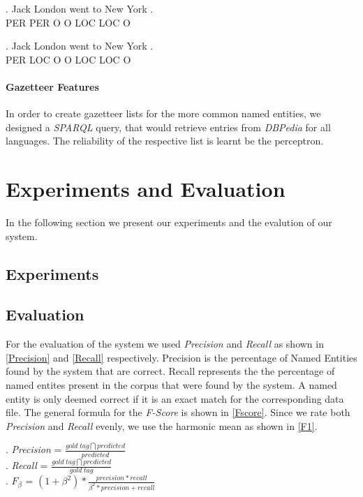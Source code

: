 \documentclass[11pt]{article}
\begin{document}
\exg. Jack London went to New York .\\
      PER   PER   O    O  LOC LOC  O \\\label{seq1}

\exg. Jack London went to New York . \\ 
      PER  LOC    O    O  LOC LOC O \\\label{seq2}
    

\paragraph*{Gazetteer Features}
In order to create gazetteer lists for the more common named entities, we designed a \emph{SPARQL} query, that would retrieve entries from \emph{DBPedia} for all
languages. The reliability of the respective list is learnt be the perceptron. 


\section{Experiments and Evaluation}
In the following section we present our experiments and the evalution of our system.
\subsection*{Experiments}


\subsection*{Evaluation}
For the evaluation of the system we used \emph{Precision} and \emph{Recall} as shown in \ref{Precision} and \ref{Recall} respectively.
Precision is the percentage of Named Entities found by the system that are correct. Recall represents the the percentage of 
named entites present in the corpus that were found by the system. 
A named entity is only deemed correct if it is an exact match for the corresponding data file.
The general formula for the \emph{F-Score} is shown in \ref{Fscore}. Since we rate both \emph{Precision} and \emph{Recall} evenly, we 
use the harmonic mean as shown in \ref{F1}.


\ex. \emph{Precision} = $ \frac{gold\; tag \bigcap predicted}{predicted}$ \label{Precision}\\


\ex. \emph{Recall} = $ \frac{gold \;tag \bigcap predicted}{gold\; tag}$ \label{Recall}\\


\ex. $F_{\beta}$ = $ (1+\beta^2)*\frac{precision *recall}{\beta^2* precision + recall}$ \label{Fscore}\\
\end{document}
